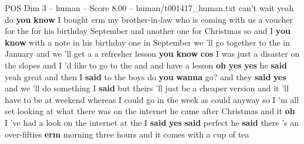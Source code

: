 \begin{textsample}{POS Dim 3 – human – Score 8.00 – human/t001417\_human.txt}  \label{ex:f3_pos_010}
can't wait yeah do \textbf{you} \textbf{know} I bought erm my brother-in-law who is coming with us a voucher for the for his birthday September and another one for Christmas so and I \textbf{you} \textbf{know} with a note in his birthday one in September we 'll go together to the in January and we 'll get a a refresher lesson \textbf{you} \textbf{know} \textbf{cos} I was just a disaster on the slopes and I 'd like to go to the and and have a lesson \textbf{oh} \textbf{yes} \textbf{yes} he \textbf{said} yeah great and then I \textbf{said} to the boys do \textbf{you} \textbf{wanna} go? and they \textbf{said} \textbf{yes} and we 'll do something I \textbf{said} but theirs 'll just be a cheaper version and it 'll have to be at weekend whereas I could go in the week as could anyway so I 'm all set looking at what there was on the internet he came after Christmas and it \textbf{oh} I 've had a look on the internet at the I \textbf{said} \textbf{yes} \textbf{said} perfect he \textbf{said} there 's an over-fifties \textbf{erm} morning three hours and it comes with a cup of tea

\end{textsample}
